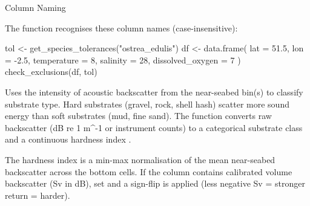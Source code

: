 \documentclass[a4paper]{book}
\begin{document}
%
\begin{Section}{Column Naming}

The function recognises these column names (case-insensitive):
\end{Section}
%
\begin{Examples}
\begin{ExampleCode}
tol <- get_species_tolerances("ostrea_edulis")
df <- data.frame(
  lat = 51.5, lon = -2.5,
  temperature = 8, salinity = 28, dissolved_oxygen = 7
)
check_exclusions(df, tol)
\end{ExampleCode}
\end{Examples}
%
\begin{Description}
Uses the intensity of acoustic backscatter from the near-seabed bin(s) to
classify substrate type. Hard substrates (gravel, rock, shell hash) scatter
more sound energy than soft substrates (mud, fine sand). The function
converts raw backscatter (dB re 1 m\textasciicircum{}-1 or instrument counts) to a
categorical substrate class and a continuous hardness index .



The hardness index is a min-max normalisation of the mean near-seabed
backscatter across the bottom  cells. If the column
contains calibrated volume backscatter (Sv in dB), set 
and a sign-flip is applied (less negative Sv = stronger return = harder).
\end{Description}
\end{document}
